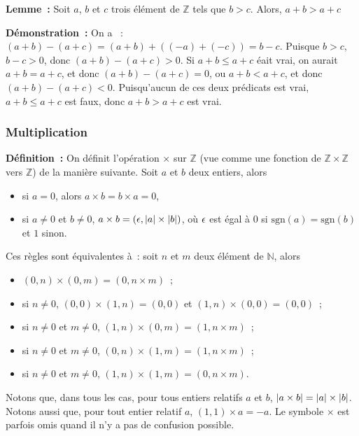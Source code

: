 \medskip

\noindent\textbf{Lemme :} Soit $a$, $b$ et $c$ trois élément de $\mathbb{Z}$ tels que $b > c$.
    Alors, $a + b > a + c$

\medskip

\noindent\textbf{Démonstration :} 
    On a  : $(a + b) - (a + c) = (a + b) + ((-a) + (-c)) = b - c$. 
    Puisque $b > c$, $b - c > 0$, donc $(a + b) - (a + c) > 0$.
    Si $a + b \leq a + c$ éait vrai, on aurait $a + b = a + c$, et donc $(a + b) - (a + c) = 0$, ou $a + b < a + c$, et donc $(a + b) - (a + c) < 0$. 
    Puisqu'aucun de ces deux prédicats est vrai, $a + b \leq a + c$ est faux, donc $a + b > a + c$ est vrai.

    \done

\subsubsection{Multiplication}

\noindent\textbf{Définition :} 
    On définit l'opération $\times$ sur $\mathbb{Z}$ (vue comme une fonction de $\mathbb{Z} \times \mathbb{Z}$ vers $\mathbb{Z}$) de la manière suivante.
    Soit $a$ et $b$ deux entiers, alors
    \begin{itemize}[nosep]
        \item si $a = 0$, alors $a \times b = b \times a = 0$,
        \item si $a \neq 0$ et $b \neq 0$, $a \times b = (\epsilon, \left\lvert a \right\rvert \times \left\lvert b \right\rvert)$, où $\epsilon$ est égal à $0$ si $\mathrm{sgn}(a) = \mathrm{sgn}(b)$ et $1$ sinon.
    \end{itemize}
    Ces règles sont équivalentes à : soit $n$ et $m$ deux élément de $\mathbb{N}$, alors 
    \begin{itemize}[nosep]
        \item $(0,n) \times (0,m) = (0, n \times m)$ ;
        \item si $n \neq 0$, $(0,0) \times (1,n) = (0, 0)$ et $(1, n) \times (0, 0) = (0,0)$ ;
        \item si $n \neq 0$ et $m \neq 0$, $(1,n) \times (0,m) = (1, n \times m)$ ;
        \item si $n \neq 0$ et $m \neq 0$, $(0,n) \times (1,m) = (1, n \times m)$ ;
        \item si $n \neq 0$ et $m \neq 0$, $(1,n) \times (1,m) = (0, n \times m)$. 
    \end{itemize}
    Notons que, dans tous les cas, pour tous entiers relatifs $a$ et $b$, $\left\lvert a \times b \right\rvert = \left\lvert a \right\rvert \times \left\lvert b \right\rvert$.
    Notons aussi que, pour tout entier relatif $a$, $(1,1) \times a = -a$.
    Le symbole $\times$ est parfois omis quand il n'y a pas de confusion possible.

